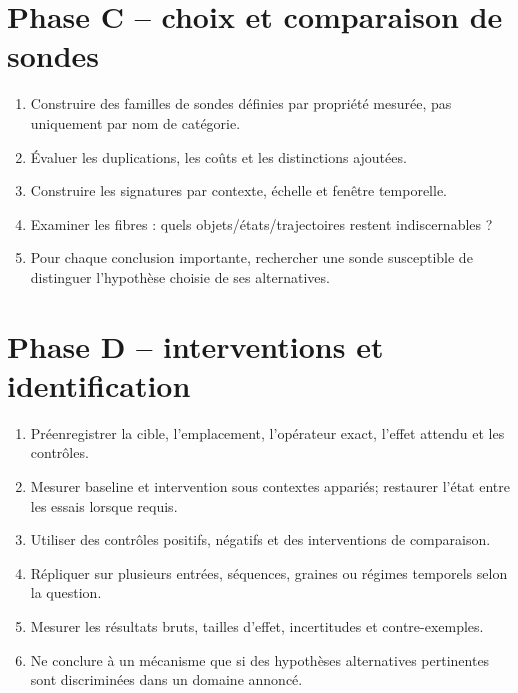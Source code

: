 \documentclass[11pt,oneside]{book}
\theoremstyle{definition}
\theoremstyle{remark}
\newcommand{\1}{\mathbf 1}
\begin{document}
\section{Phase C -- choix et comparaison de sondes}
\begin{enumerate}
\item Construire des familles de sondes définies par propriété mesurée, pas uniquement par nom de catégorie.
\item Évaluer les duplications, les coûts et les distinctions ajoutées.
\item Construire les signatures par contexte, échelle et fenêtre temporelle.
\item Examiner les fibres : quels objets/états/trajectoires restent indiscernables ?
\item Pour chaque conclusion importante, rechercher une sonde susceptible de distinguer l'hypothèse choisie de ses alternatives.
\end{enumerate}

\section{Phase D -- interventions et identification}
\begin{enumerate}
\item Préenregistrer la cible, l'emplacement, l'opérateur exact, l'effet attendu et les contrôles.
\item Mesurer baseline et intervention sous contextes appariés; restaurer l'état entre les essais lorsque requis.
\item Utiliser des contrôles positifs, négatifs et des interventions de comparaison.
\item Répliquer sur plusieurs entrées, séquences, graines ou régimes temporels selon la question.
\item Mesurer les résultats bruts, tailles d'effet, incertitudes et contre-exemples.
\item Ne conclure à un mécanisme que si des hypothèses alternatives pertinentes sont discriminées dans un domaine annoncé.
\end{enumerate}
\end{document}
